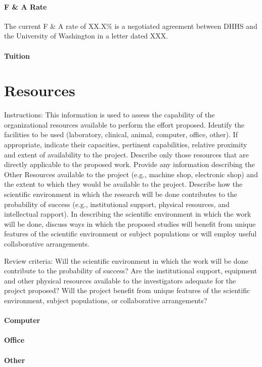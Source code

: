 \documentclass[11pt]{article}
\newcommand{\instructions}[1]{}
\renewcommand{\instructions}[1]{{\scriptsize \sc #1}}
\begin{document}
\paragraph{F \& A Rate}
The current F \& A rate of XX.X\% is a negotiated agreement between DHHS and the University of Washington in a letter dated XXX.

\paragraph{Tuition}

\clearpage
\section*{Resources}

\instructions{ Instructions: This information is used to assess the
    capability of the organizational resources available to perform
    the effort proposed.  Identify the facilities to be used
    (laboratory, clinical, animal, computer, office, other). If
    appropriate, indicate their capacities, pertinent capabilities,
    relative proximity and extent of availability to the
    project. Describe only those resources that are directly
    applicable to the proposed work. Provide any information
    describing the Other Resources available to the project (e.g.,
    machine shop, electronic shop) and the extent to which they would
    be available to the project.  Describe how the scientific
    environment in which the research will be done contributes to the
    probability of success (e.g., institutional support, physical
    resources, and intellectual rapport). In describing the scientific
    environment in which the work will be done, discuss ways in which
    the proposed studies will benefit from unique features of the
    scientific environment or subject populations or will employ
    useful collaborative arrangements.}

\instructions{ Review criteria: Will the scientific environment in
    which the work will be done contribute to the probability of
    success? Are the institutional support, equipment and other
    physical resources available to the investigators adequate for the
    project proposed? Will the project benefit from unique features of
    the scientific environment, subject populations, or collaborative
    arrangements?}

\paragraph{Computer}

\paragraph{Office}

\paragraph{Other}
\end{document}
